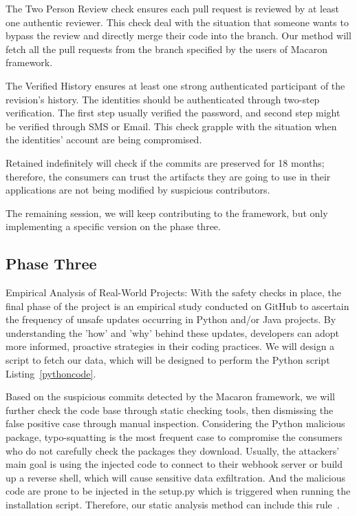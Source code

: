 The Two Person Review check ensures each pull request is reviewed by at least one authentic reviewer.
This check deal with the situation that someone wants to bypass the review and directly merge 
their code into the branch. Our method will fetch all the pull requests from the branch 
specified by the users of Macaron framework.

The Verified History ensures at least one strong authenticated participant of the revision's history.
The identities should be authenticated through two-step verification. The first step usually 
verified the password, and second step might be verified through SMS or Email. This check grapple
with the situation when the identities' account are being compromised.

Retained indefinitely will check if the commits are preserved for 18 months; therefore, the
consumers can trust the artifacts they are going to use in their applications are not being 
modified by suspicious contributors.

The remaining session, we will keep contributing to the framework, but only implementing a
specific version on the phase three.
\subsection{Phase Three}
Empirical Analysis of Real-World Projects: With the safety checks in place, 
the final phase of the project is an empirical study conducted on GitHub to ascertain
the frequency of unsafe updates occurring in Python and/or Java projects.
By understanding the 'how' and 'why' behind these updates, developers can adopt more 
informed, proactive strategies in their coding practices. We will design a script to fetch
our data, which will be designed to perform the Python script Listing~\ref{pythoncode}.

Based on the suspicious commits detected by the Macaron framework, we will further check the 
code base through static checking tools, then dismissing the false positive case through manual inspection.
Considering the Python malicious package, typo-squatting is the most frequent case to compromise 
the consumers who do not carefully check the packages they download. Usually, the attackers' main
goal is using the injected code to connect to their webhook server or build up a reverse shell, which 
will cause sensitive data exfiltration. And the malicious code are prone to be injected in the 
setup.py which is triggered when running the installation script. Therefore, our static analysis 
method can include this rule~\cite{bertus2018detecting}.

